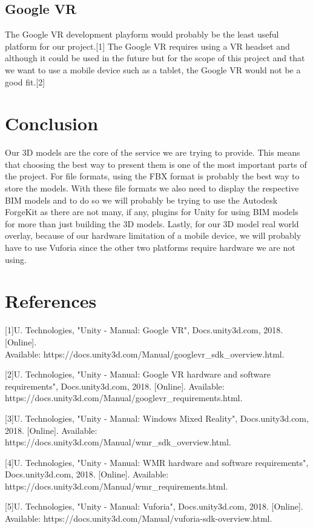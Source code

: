 \documentclass[onecolumn, draftclsnofoot,10pt, compsoc]{IEEEtran}
\begin{document}
\subsection{Google VR}
The Google VR development playform would probably be the least useful platform for our project.[1] The Google VR requires using a VR headset and although it could be used in the future but for the scope of this project and that we want to use a mobile device such as a tablet, the Google VR would not be a good fit.[2]
\section{Conclusion}
Our 3D models are the core of the service we are trying to provide. This means that choosing the best way to present them is one of the most important parts of the project. For file formats, using the FBX format is probably the best way to store the models. With these file formats we also need to display the respective BIM models and to do so we will probably be trying to use the Autodesk ForgeKit as there are not many, if any, plugins for Unity for using BIM models for more than just building the 3D models. Lastly, for our 3D model real world overlay, because of our hardware limitation of a mobile device, we will probably have to use Vuforia since the other two platforms require hardware we are not using.

\newpage
\section{References}

[1]U. Technologies, "Unity - Manual: Google VR", Docs.unity3d.com, 2018. [Online]. \\Available: https://docs.unity3d.com/Manual/googlevr\_sdk\_overview.html. 

[2]U. Technologies, "Unity - Manual: Google VR hardware and software requirements", Docs.unity3d.com, 2018. [Online]. Available: https://docs.unity3d.com/Manual/googlevr\_requirements.html.

[3]U. Technologies, "Unity - Manual: Windows Mixed Reality", Docs.unity3d.com, 2018. [Online]. Available: https://docs.unity3d.com/Manual/wmr\_sdk\_overview.html.

[4]U. Technologies, "Unity - Manual: WMR hardware and software requirements", Docs.unity3d.com, 2018. [Online]. Available: https://docs.unity3d.com/Manual/wmr\_requirements.html.

[5]U. Technologies, "Unity - Manual: Vuforia", Docs.unity3d.com, 2018. [Online]. \\Available: https://docs.unity3d.com/Manual/vuforia-sdk-overview.html. 
\end{document}
